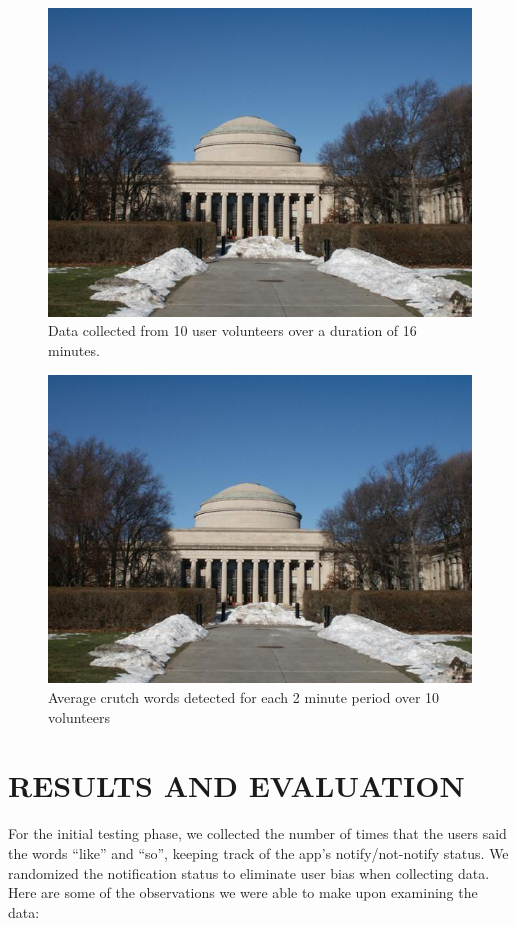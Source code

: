 \documentclass{sigchi}
\begin{document}
\begin{figure}[!h]
\centering
\includegraphics[width=0.9\columnwidth]{Figure1}
\caption{Data collected from 10 user volunteers over a duration of 16 minutes.
}
\label{fig:figure2}
\end{figure}


\begin{figure}[!h]
\centering
\includegraphics[width=0.9\columnwidth]{Figure1}
\caption{Average crutch words detected for each 2 minute period over 10 volunteers
}
\label{fig:figure3}
\end{figure}


\section{RESULTS AND EVALUATION}


For the initial testing phase, we collected the number of times that the users said the words “like” and “so”, keeping track of the app’s notify/not-notify status. We randomized the notification status to  eliminate user bias when collecting data. Here are some of the observations we were able to make upon examining the data:
\end{document}
